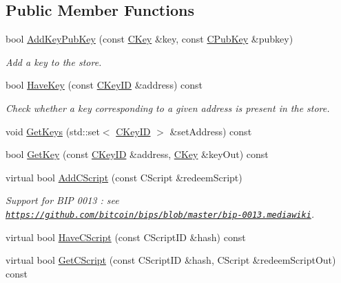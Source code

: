 \subsection*{Public Member Functions}
\begin{DoxyCompactItemize}
\item 
bool \hyperlink{class_c_basic_key_store_acc2e33f319de88e88f86b0dc79bdcb65}{Add\+Key\+Pub\+Key} (const \hyperlink{class_c_key}{C\+Key} \&key, const \hyperlink{class_c_pub_key}{C\+Pub\+Key} \&pubkey)
\begin{DoxyCompactList}\small\item\em Add a key to the store. \end{DoxyCompactList}\item 
bool \hyperlink{class_c_basic_key_store_a29a60832d549913b1fa8be77b95205a5}{Have\+Key} (const \hyperlink{class_c_key_i_d}{C\+Key\+I\+D} \&address) const 
\begin{DoxyCompactList}\small\item\em Check whether a key corresponding to a given address is present in the store. \end{DoxyCompactList}\item 
void \hyperlink{class_c_basic_key_store_a60f46db5eec334d41e5ad6e342ae2957}{Get\+Keys} (std\+::set$<$ \hyperlink{class_c_key_i_d}{C\+Key\+I\+D} $>$ \&set\+Address) const 
\item 
bool \hyperlink{class_c_basic_key_store_a3cf9b5d002a8af75e7f90ae7654a234f}{Get\+Key} (const \hyperlink{class_c_key_i_d}{C\+Key\+I\+D} \&address, \hyperlink{class_c_key}{C\+Key} \&key\+Out) const 
\item 
virtual bool \hyperlink{class_c_basic_key_store_a56249ce3540398999cd397eeb662e836}{Add\+C\+Script} (const C\+Script \&redeem\+Script)
\begin{DoxyCompactList}\small\item\em Support for B\+I\+P 0013 \+: see \href{https://github.com/bitcoin/bips/blob/master/bip-0013.mediawiki}{\tt https\+://github.\+com/bitcoin/bips/blob/master/bip-\/0013.\+mediawiki}. \end{DoxyCompactList}\item 
virtual bool \hyperlink{class_c_basic_key_store_a2e21398364927d920b15d3e10171cd97}{Have\+C\+Script} (const C\+Script\+I\+D \&hash) const 
\item 
virtual bool \hyperlink{class_c_basic_key_store_aa7b10f974cfdc078f55fdb6adf8774a5}{Get\+C\+Script} (const C\+Script\+I\+D \&hash, C\+Script \&redeem\+Script\+Out) const 
\item 

\end{DoxyCompactItemize}

